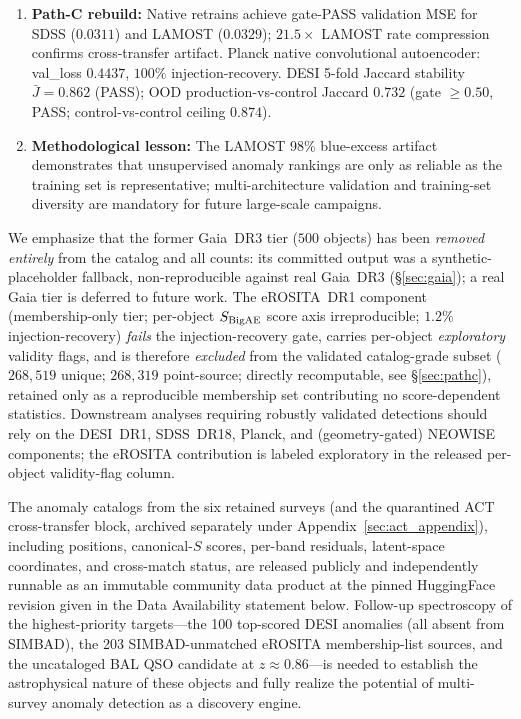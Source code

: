 \documentclass[aps,prd,twocolumn,superscriptaddress,showpacs,preprintnumbers,nofootinbib,longbibliography,floatfix]{revtex4-2}
\begin{document}
\begin{enumerate}[leftmargin=*]
\item \textbf{Path-C rebuild:} Native retrains achieve gate-PASS validation MSE for SDSS ($0.0311$) and LAMOST ($0.0329$); $21.5\times$ LAMOST rate compression confirms cross-transfer artifact. Planck native convolutional autoencoder: val\_loss $0.4437$, $100\%$ injection-recovery. DESI 5-fold Jaccard stability $\bar{J} = 0.862$ (PASS); OOD production-vs-control Jaccard $0.732$ (gate $\geq 0.50$, PASS; control-vs-control ceiling $0.874$).

\item \textbf{Methodological lesson:} The LAMOST 98\% blue-excess artifact demonstrates that unsupervised anomaly rankings are only as reliable as the training set is representative; multi-architecture validation and training-set diversity are mandatory for future large-scale campaigns.
\end{enumerate}

We emphasize that the former Gaia~DR3 tier ($500$ objects) has been \emph{removed entirely} from the catalog and all counts: its committed output was a synthetic-placeholder fallback, non-reproducible against real Gaia~DR3 (\S\ref{sec:gaia}); a real Gaia tier is deferred to future work. The eROSITA~DR1 component (membership-only tier; per-object $S_{\rm BigAE}$ score axis irreproducible; $1.2\%$ injection-recovery) \emph{fails} the injection-recovery gate, carries per-object \textit{exploratory} validity flags, and is therefore \emph{excluded} from the validated catalog-grade subset ($268{,}519$ unique; $268{,}319$ point-source; directly recomputable, see \S\ref{sec:pathc}), retained only as a reproducible membership set contributing no score-dependent statistics. Downstream analyses requiring robustly validated detections should rely on the DESI~DR1, SDSS~DR18, Planck, and (geometry-gated) NEOWISE components; the eROSITA contribution is labeled exploratory in the released per-object validity-flag column.

The anomaly catalogs from the six retained surveys (and the quarantined ACT cross-transfer block, archived separately under Appendix~\ref{sec:act_appendix}), including positions, canonical-$S$ scores, per-band residuals, latent-space coordinates, and cross-match status, are released publicly and independently runnable as an immutable community data product at the pinned HuggingFace revision given in the Data Availability statement below. Follow-up spectroscopy of the highest-priority targets---the 100 top-scored DESI anomalies (all absent from SIMBAD), the 203 SIMBAD-unmatched eROSITA membership-list sources, and the uncataloged BAL QSO candidate at $z \approx 0.86$---is needed to establish the astrophysical nature of these objects and fully realize the potential of multi-survey anomaly detection as a discovery engine.
\end{document}

